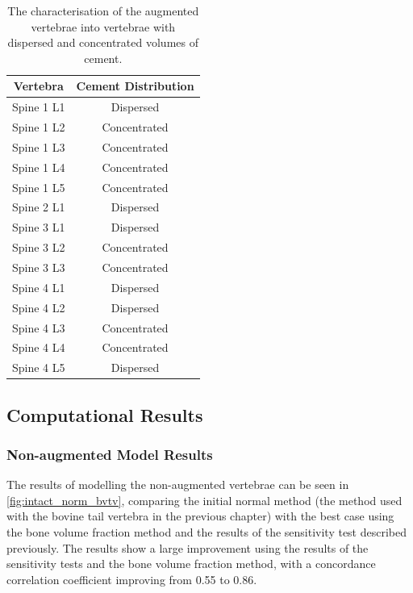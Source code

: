 \begin{table}[h!]
	\caption{The characterisation of the augmented vertebrae into vertebrae with
dispersed and concentrated volumes of cement.}
	\label{tab:conc_disp}
	\centering
	\begin{tabular}{c|c}
    Vertebra & Cement Distribution \\
    \hline
    \hline

    Spine 1 L1 & Dispersed \\
    Spine 1 L2 & Concentrated\\
    Spine 1 L3 & Concentrated\\
    Spine 1 L4 & Concentrated\\
    Spine 1 L5 & Concentrated\\
    Spine 2 L1 & Dispersed \\
    Spine 3 L1 & Dispersed \\
    Spine 3 L2 & Concentrated\\
    Spine 3 L3 & Concentrated\\
    Spine 4 L1 & Dispersed \\
    Spine 4 L2 & Dispersed \\
    Spine 4 L3 & Concentrated\\
    Spine 4 L4 & Concentrated\\
    Spine 4 L5 & Dispersed \\
    \hline
	\end{tabular}
\end{table}



\subsection{Computational Results}


\subsubsection{Non-augmented Model Results}

The results of modelling the non-augmented vertebrae can be seen in
\cref{fig:intact_norm_bvtv}, comparing the initial normal method (the method
used with the bovine tail vertebra in the previous chapter) with the best case
using the bone volume fraction method and the results of the sensitivity test
described previously.
The results show a large improvement using the results of the sensitivity tests
and the bone volume fraction method, with a concordance correlation coefficient
improving from 0.55 to 0.86.

